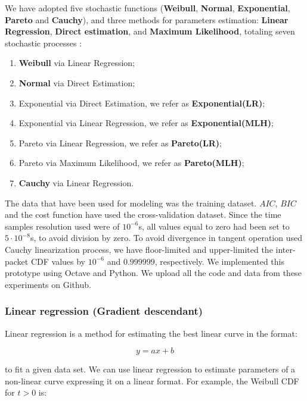 We have adopted five stochastic functions (\textbf{Weibull}, \textbf{Normal}, \textbf{Exponential}, \textbf{Pareto} and \textbf{Cauchy}), and three methods for parameters estimation: \textbf{Linear Regression}, \textbf{Direct estimation}, and \textbf{Maximum Likelihood}, totaling seven stochastic processes : 
\begin{enumerate}
\item \textbf{Weibull} via Linear Regression;
\item \textbf{Normal} via Direct Estimation;
\item Exponential via Direct Estimation, we refer as \textbf{Exponential(LR)};
\item Exponential via Linear Regression, we refer as \textbf{Exponential(MLH)};
\item Pareto via Linear Regression, we refer as \textbf{Pareto(LR)};
\item Pareto via Maximum Likelihood, we refer as \textbf{Pareto(MLH)};
\item \textbf{Cauchy} via Linear Regression.
\end{enumerate}



The data that have been used for modeling was the training dataset. $AIC$, $BIC$ and the cost function have used the cross-validation dataset. Since the time samples resolution used were of $10^{-6}$s, all values equal to zero had been set to $5\cdot10^{-8}$s, to avoid division by zero. To avoid divergence in tangent operation used  Cauchy linearization process, we have floor-limited and upper-limited the inter-packet CDF values by  $10^{-6}$ and $0.999999$, respectively. We implemented this prototype using Octave and Python. We upload all the code and data from these experiments on Github\cite{aic-bic-repo}. 


\subsubsection{Linear regression (Gradient descendant)}


Linear regression is a method for estimating the best linear curve in the format:

\begin{equation}
y = ax + b
\end{equation}

to fit a given data set. We can use linear regression to estimate parameters of a non-linear curve expressing it on a linear format. For example, the Weibull CDF for $t > 0$ is:

